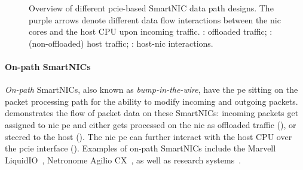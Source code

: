 \begin{figure}[tp]
    \quad
    \caption[Overview of different SmartNIC data path designs]{Overview of different \ac{pcie}-based SmartNIC data path designs.  The purple arrows denote different data flow interactions between the \ac{nic} cores and the host CPU upon incoming traffic.  : offloaded traffic; : (non-offloaded) host traffic; : host-\ac{nic} interactions.} \label{fig:smartnic-datapaths}
\end{figure}

\paragraph{On-path SmartNICs} \emph{On-path} SmartNICs, also known as \emph{bump-in-the-wire}, have the \ac{pe} sitting on the packet processing path for the ability to modify incoming and outgoing packets.   demonstrates the flow of packet data on these SmartNICs: incoming packets get assigned to \ac{nic} \ac{pe} and either gets processed on the \ac{nic} as offloaded traffic (), or steered to the host ().  The \ac{nic} \ac{pe} can further interact with the host CPU over the \ac{pcie} interface ().  Examples of on-path SmartNICs include the Marvell LiquidIO~\cite{noauthor_marvell_nodate}, Netronome Agilio CX~\cite{noauthor_agilio_nodate}, as well as research systems~\cite{guo_framework_2022, wang_fpganic_2022}.

